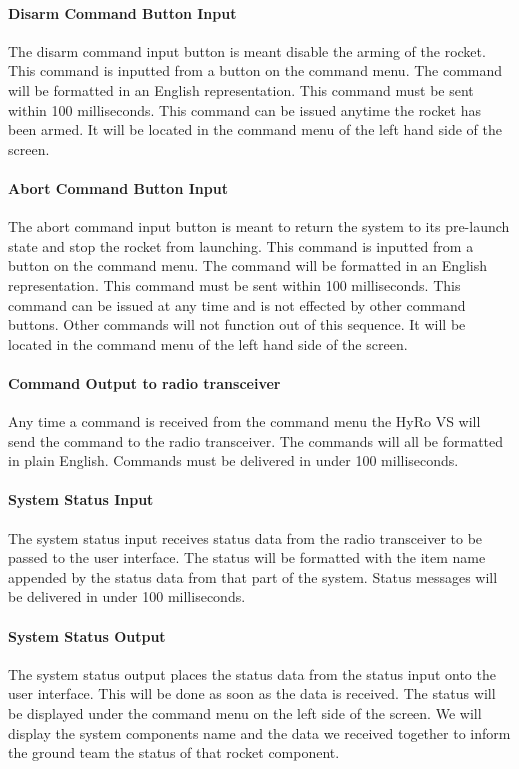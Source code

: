 \documentclass[10pt,draftclsnofoot,onecolumn,compsoc]{IEEEtran}
\begin{document}
\paragraph{\bf Disarm Command Button Input}
The disarm command input button is meant disable the arming of the rocket. This command is inputted from a button on the command menu. The command will be formatted in an English representation.  This command must be sent within 100 milliseconds. This command can be issued anytime the rocket has been armed. It will be located in the command menu of the left hand side of the screen.
\paragraph{\bf Abort Command Button Input}
The abort command input button is meant to return the system to its pre-launch state and stop the rocket from launching. This command is inputted from a button on the command menu. The command will be formatted in an English representation.  This command must be sent within 100 milliseconds. This command can be issued at any time and is not effected by other command buttons. Other commands will not function out of this sequence. It will be located in the command menu of the left hand side of the screen.
\paragraph{\bf Command Output to radio transceiver}
	Any time a command is received from the command menu the HyRo VS will send the command to the radio transceiver. The commands will all be formatted in plain English. Commands must be delivered in under 100 milliseconds.
\paragraph{\bf System Status Input}
	The system status input receives status data from the radio transceiver to be passed to the user interface. The status will be formatted with the item name appended by the status data from that part of the system. Status messages will be delivered in under 100 milliseconds. 
\paragraph{\bf System Status Output}
The system status output places the status data from the status input onto the user interface. This will be done as soon as the data is received. The status will be displayed under the command menu on the left side of the screen. We will display the system components name and the data we received together to inform the ground team the status of that rocket component.
\end{document}
